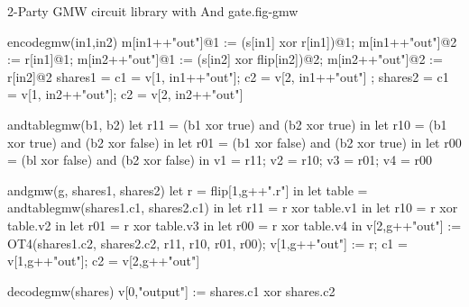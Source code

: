 \begin{fpfig}[t]{2-Party GMW circuit library with And gate.}{fig-gmw}
{\footnotesize
  \begin{verbatimtab}
    encodegmw(in1,in2) {
      m[in1++"out"]@1 := (s[in1] xor r[in1])@1;
      m[in1++"out"]@2 := r[in1]@1;
      m[in2++"out"]@1 := (s[in2] xor flip[in2])@2;
      m[in2++"out"]@2 := r[in2]@2
      { shares1 = { c1 = v[1, in1++"out"]; c2 = v[2, in1++"out"] };
        shares2 = { c1 = v[1, in2++"out"]; c2 = v[2, in2++"out"]} } 
    }
    
    andtablegmw(b1, b2) {
      let r11 = (b1 xor true) and (b2 xor true) in
      let r10 = (b1 xor true) and (b2 xor false) in
      let r01 = (b1 xor false) and (b2 xor true) in
      let r00 = (bl xor false) and (b2 xor false) in
      { v1 = r11; v2 = r10; v3 = r01; v4 = r00 }
    }
    
    andgmw(g, shares1, shares2) {
      let r = flip[1,g++".r"] in
      let table = andtablegmw(shares1.c1, shares2.c1) in
      let r11 =  r xor table.v1 in
      let r10 =  r xor table.v2 in
      let r01 =  r xor table.v3 in
      let r00 =  r xor table.v4 in
        v[2,g++"out"] := OT4(shares1.c2, shares2.c2, r11, r10, r01, r00);
      v[1,g++"out"] := r;
      { c1 = v[1,g++"out"]; c2 = v[2,g++"out"]}
    }
    
    decodegmw(shares) { v[0,"output"] := shares.c1 xor shares.c2 }   \end{verbatimtab}
}
\end{fpfig}
